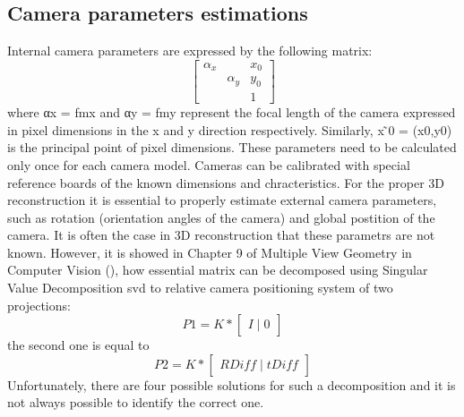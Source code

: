 \subsection{Camera parameters estimations}
Internal camera parameters are expressed by the following matrix:
\begin{equation}
\begin{bmatrix}
\alpha _{x} &  & x_{0} \\ 
 & \alpha _{y} & y_{0}\\ 
 &  & 1
\end{bmatrix}
\end{equation}
where αx = fmx and αy = fmy represent the focal length of the camera expressed in pixel dimensions in the x and y direction respectively. 
Similarly, x ̃0 = (x0,y0) is the principal point of pixel dimensions. These parameters need to be calculated only once for each camera model. Cameras can be calibrated with special reference boards of the known dimensions and chracteristics.
For the proper 3D reconstruction it is essential to properly estimate external camera parameters, such as rotation (orientation angles of the camera) and global postition of the camera. It is often the case in 3D reconstruction that these parametrs are not known. However, it is showed in Chapter 9 of Multiple View Geometry in Computer Vision (\cite{HartleyMultipleView}), how essential matrix can be decomposed using Singular Value Decomposition \gls{svd} to relative camera positioning system of two projections:
\begin{equation}
 P1 = K * \begin{bmatrix}I\mid 0\end{bmatrix}
\end{equation}
the second one is equal to 
\begin{equation}
 P2 = K * \begin{bmatrix}RDiff\mid tDiff\end{bmatrix}
\end{equation}
Unfortunately, there are four possible solutions for such a decomposition and it is not always possible to identify the correct one.
